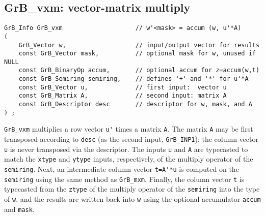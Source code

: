 \documentclass[12pt]{article}
\begin{document}
% 

\newpage
\subsection{{\sf GrB\_vxm:} vector-matrix multiply} %
\label{vxm}

\begin{mdframed}[userdefinedwidth=6in]
{\footnotesize
\begin{verbatim}
GrB_Info GrB_vxm                    // w'<mask> = accum (w, u'*A)
(
    GrB_Vector w,                   // input/output vector for results
    const GrB_Vector mask,          // optional mask for w, unused if NULL
    const GrB_BinaryOp accum,       // optional accum for z=accum(w,t)
    const GrB_Semiring semiring,    // defines '+' and '*' for u'*A
    const GrB_Vector u,             // first input:  vector u
    const GrB_Matrix A,             // second input: matrix A
    const GrB_Descriptor desc       // descriptor for w, mask, and A
) ;
\end{verbatim} } \end{mdframed}

\verb'GrB_vxm' multiplies a row vector \verb"u'" times a matrix \verb'A'.  The
matrix \verb'A' may be first transposed according to \verb'desc' (as the second
input, \verb'GrB_INP1'); the column vector \verb'u' is never transposed via the
descriptor.  The inputs \verb'u' and \verb'A' are typecasted to match the
\verb'xtype' and \verb'ytype' inputs, respectively, of the multiply operator of
the \verb'semiring'.  Next, an intermediate column vector \verb"t=A'*u" is
computed on the \verb'semiring' using the same method as \verb'GrB_mxm'.
Finally, the column vector \verb't' is typecasted from the \verb'ztype' of the
multiply operator of the \verb'semiring' into the type of \verb'w', and the
results are written back into \verb'w' using the optional accumulator
\verb'accum' and \verb'mask'.
\end{document}
